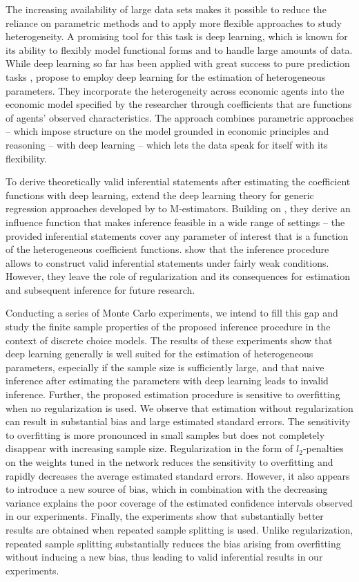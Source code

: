 \documentclass[a4paper, 12pt]{article}
\begin{document}
The increasing availability of large data sets makes it possible to reduce the reliance on parametric methods and to apply more flexible approaches to study heterogeneity. A promising tool for this task is deep learning, which is known for its ability to flexibly model functional forms  and to handle large amounts of data. While deep learning so far has been applied with great success to pure prediction tasks \cite{LeCun2015},  propose to employ deep learning for the estimation of heterogeneous parameters. They incorporate the heterogeneity across economic agents into the economic model specified by the researcher through coefficients that are functions of agents' observed characteristics. The approach combines parametric approaches -- which impose structure on the model grounded in economic principles and  reasoning -- with deep learning -- which lets the data speak for itself with its flexibility.

To derive theoretically valid inferential statements after estimating the coefficient functions with deep learning,  extend the deep learning theory for generic regression approaches developed by  to M-estimators. Building on , they derive an influence function that makes inference feasible in a wide range of settings -- the provided inferential statements cover any parameter of interest that is a function of the heterogeneous coefficient functions.  show  that the inference procedure allows to construct valid inferential statements under fairly weak conditions. However, they leave the role of regularization and its consequences for estimation and subsequent inference for future research.

Conducting a series of Monte Carlo experiments, we intend to fill this gap and study the finite sample properties of the proposed inference procedure in the context of discrete choice models. The results of these experiments show that deep learning generally is well suited for the estimation of heterogeneous parameters, especially if the sample size is sufficiently large, and that naive inference after estimating the parameters with deep learning leads to invalid inference. 
Further, the proposed estimation procedure is sensitive to overfitting when no regularization is used. We observe that  estimation without regularization can result in substantial bias and large estimated standard errors. The sensitivity to overfitting is more pronounced in small samples but does not completely disappear with increasing sample size. 
Regularization in the form of  $l_2$-penalties on the weights tuned in the network reduces the sensitivity to overfitting and rapidly decreases the average estimated standard errors.
However, it also appears to introduce a new source of bias, which in combination with the decreasing variance explains the poor coverage of the estimated confidence intervals observed in our experiments.
Finally, the experiments show that substantially better results are obtained when repeated sample splitting is used. Unlike regularization, repeated sample splitting substantially reduces the bias arising from overfitting  without inducing a new bias, thus leading to valid inferential results in our experiments.
\end{document}
